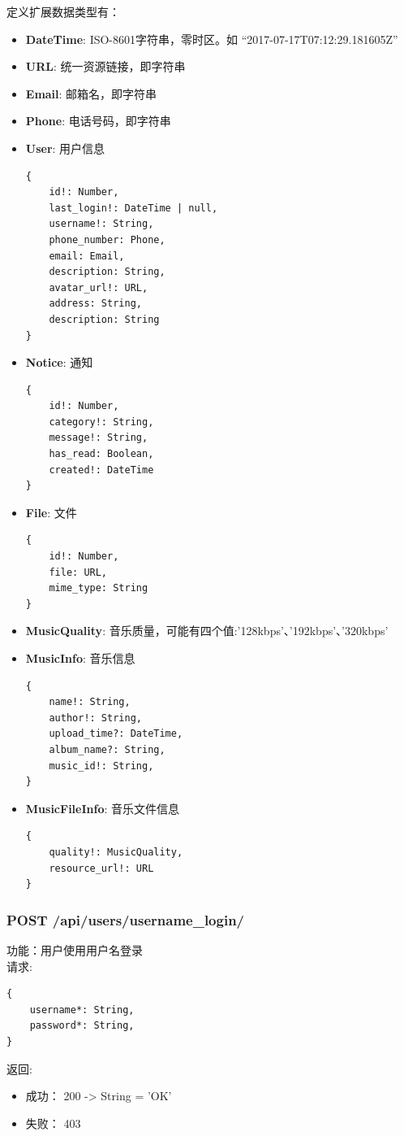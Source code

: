 定义扩展数据类型有：
\begin{itemize}
	\item \textbf{DateTime}: ISO-8601字符串，零时区。如 “2017-07-17T07:12:29.181605Z”
	\item \textbf{URL}: 统一资源链接，即字符串
	\item \textbf{Email}: 邮箱名，即字符串
	\item \textbf{Phone}: 电话号码，即字符串
	\item \textbf{User}: 用户信息
\begin{lstlisting}[numbers=none, frame=none]
{
    id!: Number,
    last_login!: DateTime | null,
    username!: String,
    phone_number: Phone,
    email: Email,
    description: String,
    avatar_url!: URL,
    address: String,
    description: String
}
\end{lstlisting}
	\item \textbf{Notice}: 通知
\begin{lstlisting}[numbers=none, frame=none]
{
    id!: Number,
    category!: String,
  	message!: String,
  	has_read: Boolean,
  	created!: DateTime
}
\end{lstlisting}
	\item \textbf{File}: 文件
\begin{lstlisting}[numbers=none, frame=none]
{
    id!: Number,
    file: URL,
    mime_type: String
}
\end{lstlisting}
\item \textbf{MusicQuality}: 音乐质量，可能有四个值:'128kbps'、'192kbps'、'320kbps'
\item \textbf{MusicInfo}: 音乐信息
\begin{lstlisting}[numbers=none, frame=none]
{
    name!: String,
    author!: String,
    upload_time?: DateTime,
    album_name?: String,
    music_id!: String,
}
\end{lstlisting}
\item \textbf{MusicFileInfo}: 音乐文件信息
\begin{lstlisting}[numbers=none, frame=none]
{
    quality!: MusicQuality,
    resource_url!: URL
}
\end{lstlisting}
\end{itemize}


\subsubsection{POST /api/users/username\_login/}

\noindent
功能：用户使用用户名登录\\
请求:
\begin{lstlisting}[numbers=none, frame=none]
{
    username*: String,
    password*: String,
}
\end{lstlisting}
返回:
\begin{itemize}
	\item 成功： 200 -> String = 'OK'
	\item 失败： 403
\end{itemize}

